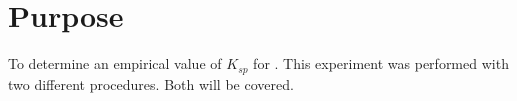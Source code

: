 
\section{Purpose}
To determine an empirical value of $K_{sp}$ for \ppt.
This experiment was performed with two different procedures. Both will be covered.